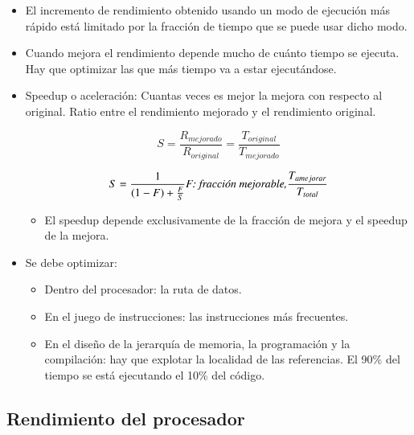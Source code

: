 \documentclass[12pt, twoside, openright]{report} %
\begin{document}
\begin{itemize}

	\item El incremento de rendimiento obtenido usando un modo de ejecución
	      más rápido está limitado por la fracción de tiempo que se puede usar
	      dicho modo.
	\item Cuando mejora el rendimiento depende mucho de cuánto tiempo se
	      ejecuta. Hay que optimizar las que más tiempo va a estar
	      ejecutándose.
	\item Speedup o aceleración: Cuantas veces es mejor la mejora con respecto
	      al original. Ratio entre el rendimiento mejorado y el rendimiento
	      original.


	      $$S=\frac {R_{mejorado}} {R_{original}}=\frac {T_{original}} {T_{mejorado}}$$

	      $$S=\frac 1 {(1-F)+\frac F S} \textit{F: fracción mejorable,}
		      \frac {T_{a\space mejorar}} {T_{total}}$$

	      \begin{itemize}
		      \item El speedup depende exclusivamente de la fracción de mejora y el
		            speedup de la mejora.
		            \begin{figure}[H]
			            {\def\svgwidth{.7\textwidth}
				            }
		            \end{figure}
	      \end{itemize}
	\item Se debe optimizar:

	      \begin{itemize}

		      \item Dentro del procesador: la ruta de datos.
		      \item En el juego de instrucciones: las instrucciones más frecuentes.
		      \item En el diseño de la jerarquía de memoria, la programación y la
		            compilación: hay que explotar la localidad de las referencias. El
		            90\% del tiempo se está ejecutando el 10\% del código.
	      \end{itemize}
\end{itemize}

\subsection{Rendimiento del procesador}
\end{document}
